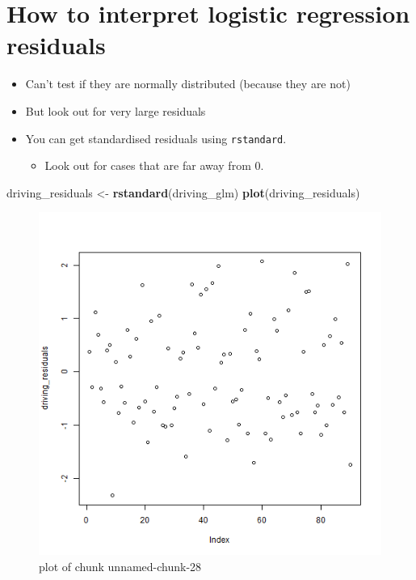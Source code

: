 \documentclass[]{article}
\newenvironment{Shaded}{}{}
\newcommand{\KeywordTok}[1]{\textcolor[rgb]{0.00,0.44,0.13}{\textbf{{#1}}}}
\newcommand{\StringTok}[1]{\textcolor[rgb]{0.25,0.44,0.63}{{#1}}}
\newcommand{\NormalTok}[1]{{#1}}
\begin{document}
\section{How to interpret logistic regression
residuals}\label{how-to-interpret-logistic-regression-residuals}

\begin{itemize}
\itemsep1pt\parskip0pt
\item
  Can't test if they are normally distributed (because they are not)
\item
  But look out for very large residuals
\item
  You can get standardised residuals using \texttt{rstandard}.

  \begin{itemize}
  \itemsep1pt\parskip0pt
  \item
    Look out for cases that are far away from 0.
  \end{itemize}
\end{itemize}

\begin{Shaded}
\begin{Highlighting}[]
\NormalTok{driving_residuals <-}\StringTok{ }\KeywordTok{rstandard}\NormalTok{(driving_glm)}
\KeywordTok{plot}\NormalTok{(driving_residuals)}
\end{Highlighting}
\end{Shaded}

\begin{figure}[htbp]
\centering
\includegraphics{Class6-figure/unnamed-chunk-28.png}
\caption{plot of chunk unnamed-chunk-28}
\end{figure}
\end{document}

